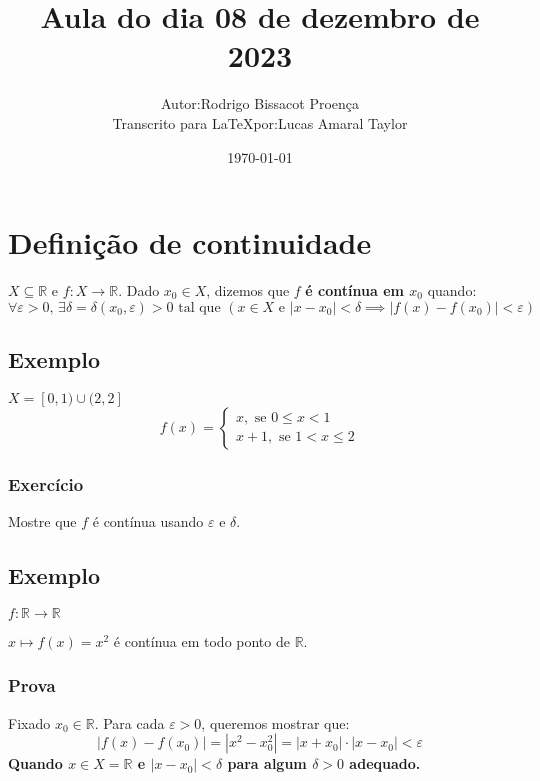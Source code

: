 \documentclass[12pt]{article}
\title{Aula do dia 08 de dezembro de 2023}
\author{
    \begin{tabular}{rl}
        Autor: & Rodrigo Bissacot Proença \\
        Transcrito para \LaTeX por: & Lucas Amaral Taylor
    \end{tabular}
}
\date{\today}
\begin{document}
    \maketitle
    \section*{Definição de continuidade}
    $X \subseteq \mathbb{R}$ e $f: X \to \mathbb{R}$. Dado $x_0 \in X$, dizemos que $f$ \textbf{é contínua em $x_0$} quando:
    \begin{equation*}
        \forall \varepsilon > 0 \text{, } \exists \delta = \delta(x_0, \varepsilon) > 0 \text{ tal que } \left( x \in X \text{ e } \left| x - x_0 \right| < \delta \implies \left| f(x) - f(x_0)\right| < \varepsilon \right)
    \end{equation*}
    
    \subsection*{Exemplo}
    $X = [0,1) \cup (2,2]$
    \begin{equation*}
        f(x)=\left\{    
        \begin{array}{l}
            x, \text{ se } 0 \leq x < 1 \\
            x+1, \text{ se } 1 <x \leq 2
        \end{array}
        \right.
    \end{equation*}
    \subsubsection*{Exercício}
    Mostre que $f$ é contínua usando $\varepsilon$ e $\delta$.
    
    \subsection*{Exemplo}
    $f: \mathbb{R} \to \mathbb{R}$
    
    $x \longmapsto f(x) = x^2$ é contínua em todo ponto de $\mathbb{R}$. 
    
    \subsubsection*{Prova}
    Fixado $x_0 \in \mathbb{R}$. Para cada $\varepsilon > 0$, queremos mostrar que: 
    \begin{equation*}
        |f(x) - f(x_0)| = |x^2 - x_0^2| = |x + x_0| \cdot |x - x_0| < \varepsilon
    \end{equation*}
    \textbf{Quando $x \in X = \mathbb{R}$ e $|x-x_0| < \delta$  para algum $\delta > 0$ adequado.}
    
\end{document}
